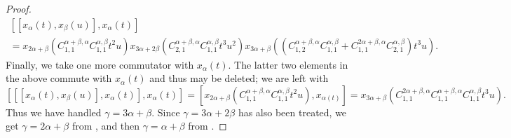 \documentclass[10pt,a4paper]{article}
\theoremstyle{definition}
\newcommand{\N}{\mathbbm N}
\newcommand{\F}{\mathbbm F}
\begin{document}
\begin{proof}
\begin{multline}
         [[x_\alpha(t), x_\beta(u)], x_\alpha(t)] \\ =    
         x_{2\alpha+\beta}(C_{1,1}^{\alpha+\beta,\alpha}C_{1,1}^{\alpha,\beta}t^2u)
         x_{3\alpha+2\beta}(C_{2,1}^{\alpha+\beta,\alpha}C_{1,1}^{\alpha,\beta} t^3u^2)
         x_{3\alpha+\beta}((C_{1,2}^{\alpha+\beta,\alpha}C_{1,1}^{\alpha,\beta} +C_{1,1}^{2\alpha+\beta,\alpha}C_{2,1}^{\alpha,\beta})t^3u).
    \end{multline}
    Finally, we take one more commutator with $x_\alpha(t)$. The latter two elements in the above commute with $x_\alpha(t)$ and thus may be deleted; we are left with
    \[
        [[[x_\alpha(t), x_\beta(u)], x_\alpha(t)], x_\alpha(t)] =[x_{2\alpha+\beta}(C_{1,1}^{\alpha+\beta,\alpha}C_{1,1}^{\alpha,\beta}t^2u), x_{\alpha(t)}] = x_{3\alpha+\beta}(C_{1,1}^{2\alpha+\beta,\alpha}C_{1,1}^{\alpha+\beta,\alpha}C_{1,1}^{\alpha,\beta}t^3u).
    \]
    Thus we have handled $\gamma = 3\alpha+\beta$.  Since $\gamma = 3\alpha+2\beta$ has also been treated, we get $\gamma = 2\alpha+\beta$ from , and then $\gamma = \alpha+\beta$ from .
\end{proof}

\end{document}
